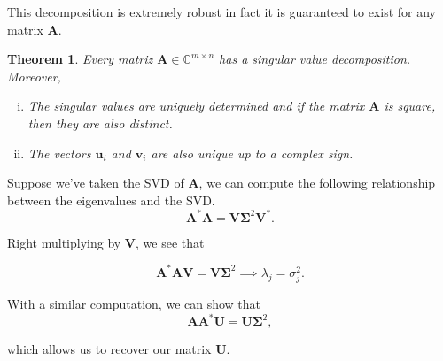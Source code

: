 \documentclass[12pt]{article}
\newcommand{\bbC}{\mathbb{C}}
\renewcommand{\vec}[1]{\mathbf{#1}}
\newtheorem{thm}{Theorem}[section]
\theoremstyle{definition}
\theoremstyle{remark}
\numberwithin{equation}{section}
\begin{document}
This decomposition is extremely robust in fact it is guaranteed to exist for any matrix $\vec{A}$.
\begin{thm}
  Every matriz $\vec{A} \in \bbC^{m\times n}$ has a singular value decomposition. Moreover,
  \begin{enumerate}[(i)]
    \item The singular values are uniquely determined and if the matrix $\vec{A}$ is square, then they are also distinct.
    \item The vectors $\vec{u}_i$ and $\vec{v}_i$ are also unique up to a complex sign.
  \end{enumerate}
\end{thm}

Suppose we've taken the SVD of $\vec{A}$, we can compute the following relationship between the eigenvalues and the SVD.
\begin{equation}
  \vec{A}^*\vec{A} = \vec{V}\vec{\Sigma}^2\vec{V}^*.
\end{equation}

Right multiplying by $\vec{V}$, we see that 

\begin{equation}
  \vec{A}^*\vec{A} \vec{V} = \vec{V}\vec{\Sigma}^2 \implies \lambda_j = \sigma_j^2.
\end{equation}

With a similar computation, we can show that
\begin{equation}
  \vec{A}\vec{A}^* \vec{U} = \vec{U} \vec{\Sigma}^2,
\end{equation}

which allows us to recover our matrix $\vec{U}$.
\end{document}
